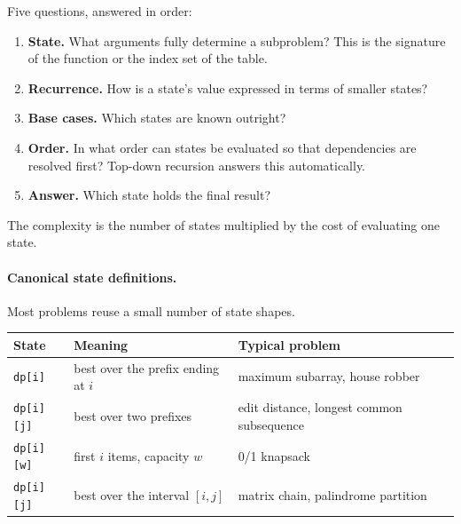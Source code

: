 \begin{keybox}[Formulating a DP]
Five questions, answered in order:
\vspace{0.5ex}

\begin{enumerate}[itemsep=1ex]
  \item \textbf{State.} What arguments fully determine a subproblem? This is
        the signature of the function or the index set of the table.
  \item \textbf{Recurrence.} How is a state's value expressed in terms of
        smaller states?
  \item \textbf{Base cases.} Which states are known outright?
  \item \textbf{Order.} In what order can states be evaluated so that
        dependencies are resolved first? Top-down recursion answers this
        automatically.
  \item \textbf{Answer.} Which state holds the final result?
\end{enumerate}

\medskip

The complexity is the number of states multiplied by the cost of evaluating
one state.
\end{keybox}

\paragraph{Canonical state definitions.} Most problems reuse a small number of
state shapes.

\begin{center}
\begin{tabular}{lll}
\toprule
\textbf{State} & \textbf{Meaning} & \textbf{Typical problem} \\
\midrule
\texttt{dp[i]}    & best over the prefix ending at $i$ & maximum subarray, house robber \\
\texttt{dp[i][j]} & best over two prefixes             & edit distance, longest common subsequence \\
\texttt{dp[i][w]} & first $i$ items, capacity $w$      & 0/1 knapsack \\
\texttt{dp[i][j]} & best over the interval $[i,j]$     & matrix chain, palindrome partition \\
\bottomrule
\end{tabular}
\end{center}

